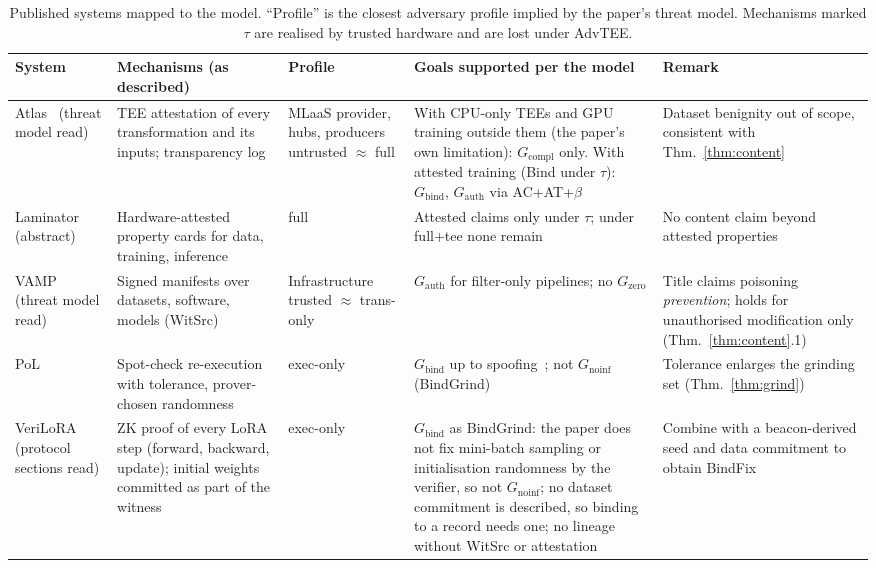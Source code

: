 \begin{table}[t]
\centering\scriptsize
\caption{Published systems mapped to the model. ``Profile'' is the closest adversary profile
implied by the paper's threat model. Mechanisms marked $\tau$ are realised by trusted
hardware and are lost under \textsf{AdvTEE}.}\label{tab:e1}
\begin{tabular}{@{}p{2.3cm}p{3.6cm}p{2.1cm}p{4.6cm}p{3.6cm}@{}}
\toprule
System & Mechanisms (as described) & Profile & Goals supported per the model & Remark\\
\midrule
Atlas~\cite{spoczynski2025atlas} (threat model read) & TEE attestation of every transformation and its inputs; transparency log & MLaaS provider, hubs, producers untrusted $\approx$ full & With CPU-only TEEs and GPU training outside them (the paper's own limitation): $G_{\mathrm{compl}}$ only. With attested training (Bind under $\tau$): $G_{\mathrm{bind}}$, $G_{\mathrm{auth}}$ via AC+AT+$\beta$ & Dataset benignity out of scope, consistent with Thm.~\ref{thm:content}\\
Laminator~\cite{duddu2025laminator} (abstract) & Hardware-attested property cards for data, training, inference & full & Attested claims only under $\tau$; under full+tee none remain & No content claim beyond attested properties\\
VAMP~\cite{stokes2021prevent} (threat model read) & Signed manifests over datasets, software, models (WitSrc) & Infrastructure trusted $\approx$ trans-only & $G_{\mathrm{auth}}$ for filter-only pipelines; no $G_{\mathrm{zero}}$ & Title claims poisoning \emph{prevention}; holds for unauthorised modification only (Thm.~\ref{thm:content}.1)\\
PoL~\cite{jia2021pol} & Spot-check re-execution with tolerance, prover-chosen randomness & exec-only & $G_{\mathrm{bind}}$ up to spoofing~\cite{fang2023pol}; not $G_{\mathrm{noinf}}$ (BindGrind) & Tolerance enlarges the grinding set (Thm.~\ref{thm:grind})\\
VeriLoRA~\cite{liao2026verilora} (protocol sections read) & ZK proof of every LoRA step (forward, backward, update); initial weights committed as part of the witness & exec-only & $G_{\mathrm{bind}}$ as \textsf{BindGrind}: the paper does not fix mini-batch sampling or initialisation randomness by the verifier, so not $G_{\mathrm{noinf}}$; no dataset commitment is described, so binding to a record needs one; no lineage without WitSrc or attestation & Combine with a beacon-derived seed and data commitment to obtain \textsf{BindFix}\\

\end{tabular}
\end{table}

